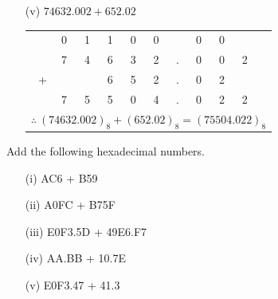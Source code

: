 \begin{solution}
\begin{itemize}
\item[(v)] $74632.002+652.02$

\begin{tabular}{rcccccccccc}
 & {\footnotesize 0} & {\footnotesize 1} & {\footnotesize 1} & {\footnotesize 0} & {\footnotesize 0} & & {\footnotesize 0} & {\footnotesize 0} & &\\
 & 7 & 4 & 6 & 3 & 2 & . & 0 & 0 & 2 &\\
+ & & & 6 & 5 & 2 & . & 0 & 2 &&\\
\cline{2-10}
 & 7 & 5 & 5 & 0 & 4 & . & 0 & 2 & 2 &\\[10pt]
\multicolumn{11}{l}{$\therefore~ (74632.002)_{8}+(652.02)_{8}=(75504.022)_{8}$}
\end{tabular}
\end{itemize}
\end{solution}

\begin{problem}
Add the following hexadecimal numbers.
\begin{itemize}
\item[(i)] AC6 + B59

\item[(ii)] A0FC + B75F

\item[(iii)] E0F3.5D + 49E6.F7

\item[(iv)] AA.BB + 10.7E

\item[(v)] E0F3.47 + 41.3
\end{itemize}
\end{problem}


